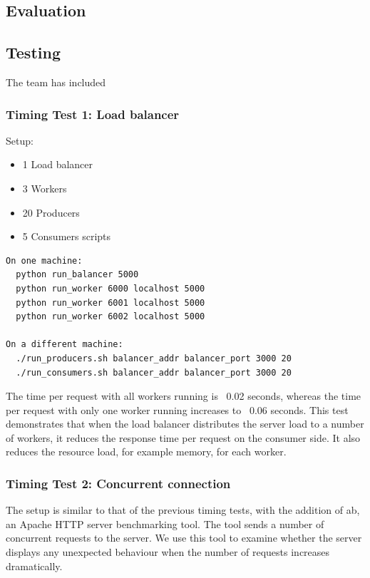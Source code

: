 \documentclass{sigchi}
\begin{document}
\subsection{Evaluation}

\subsection{Testing}

The team has included 

\subsubsection{Timing Test 1: Load balancer}

Setup:

\begin{itemize}
  \item 1 Load balancer
  \item 3 Workers
  \item 20 Producers
  \item 5 Consumers scripts
\end{itemize}

\vspace*{\baselineskip}
\begin{lstlisting}[caption={Timing test 1: instructions}, mathescape, upquote=true]
On one machine:
  python run_balancer 5000
  python run_worker 6000 localhost 5000
  python run_worker 6001 localhost 5000
  python run_worker 6002 localhost 5000

On a different machine:
  ./run_producers.sh balancer_addr balancer_port 3000 20
  ./run_consumers.sh balancer_addr balancer_port 3000 20
\end{lstlisting}

The time per request with all workers running is ~0.02 seconds, whereas the time per request with only one worker running increases to ~0.06 seconds. This test demonstrates that when the load balancer distributes the server load to a number of workers, it reduces the response time per request on the consumer side. It also reduces the resource load, for example memory, for each worker.

\subsubsection{Timing Test 2: Concurrent connection}

The setup is similar to that of the previous timing tests, with the addition of ab, an Apache HTTP server benchmarking tool. The tool sends a number of concurrent requests to the server. We use this tool to examine whether the server displays any unexpected behaviour when the number of requests increases dramatically.
\end{document}
